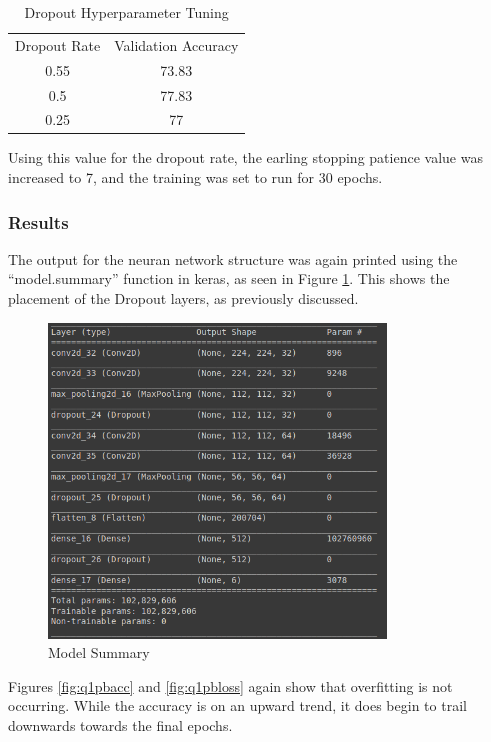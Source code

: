 \begin{table}[H]
	\centering
	\caption{Dropout Hyperparameter Tuning}
	\label{tab:d2hyp}
	\begin{tabular}{|c|c|}
	\hline
	Dropout Rate & Validation Accuracy \\
	0.55 & 73.83 \\
	0.5 & 77.83\\
	0.25 & 77 \\
	\hline
	\hline
	\end{tabular}
\end{table}

Using this value for the dropout rate, the earling stopping patience value was
increased to 7, and the training was set to run for 30 epochs.

\subsubsection{Results}

The output for the neuran network structure was again printed using the
``model.summary'' function in keras, as seen in Figure \ref{fig:q1pbmodel}.
This shows the placement of the Dropout layers, as previously discussed.

\begin{figure}[H]
	\centering
	\includegraphics[width=0.8\textwidth]{images/q1/pb/q1pbmodel}
	\caption{Model Summary}
	\label{fig:q1pbmodel}
\end{figure}

Figures \ref{fig:q1pbacc} and \ref{fig:q1pbloss} again show that overfitting is
not occurring. While the accuracy is on an upward trend, it does begin to trail
downwards towards the final epochs.

